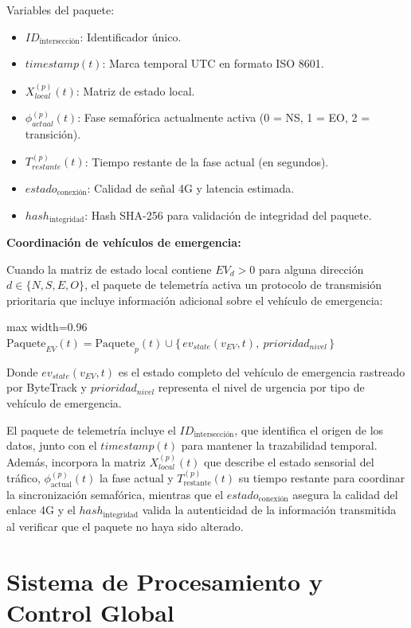 \documentclass[12pt,a4paper,oneside]{report}
\newenvironment{centeredmath}
  {\begin{center}\begin{adjustbox}{max width=0.96\linewidth}\(\displaystyle}
  {\)\end{adjustbox}\end{center}}
\begin{document}
Variables del paquete:

\begin{itemize}
\item
  \(ID_{\text{intersección}}\): Identificador único.
\item
  \(timestamp(t)\): Marca temporal UTC en formato ISO 8601.
\item
  \(X_{local}^{(p)}(t)\): Matriz de estado local.
\item
  \(\phi_{actual}^{(p)}(t)\): Fase semafórica actualmente activa (0 = NS, 1 = EO, 2 = transición).
\item
  \(T_{restante}^{(p)}(t)\): Tiempo restante de la fase actual (en segundos).
\item
  \(estado_{\text{conexión}}\): Calidad de señal 4G y latencia estimada.
\item
  \(hash_{\text{integridad}}\): Hash SHA-256 para validación de integridad del paquete.
\end{itemize}

\textbf{Coordinación de vehículos de emergencia:}

Cuando la matriz de estado local contiene \(EV_{d} > 0\) para alguna dirección \(d \in \{N, S, E, O\}\), el paquete de telemetría activa un protocolo de transmisión prioritaria que incluye información adicional sobre el vehículo de emergencia:

\begin{centeredmath}
\text{Paquete}_{EV}(t) = \text{Paquete}_{p}(t) \cup \{\, ev_{state}(v_{EV},t),\ prioridad_{nivel} \,\}
\end{centeredmath}

Donde \(ev_{state}(v_{EV},t)\) es el estado completo del vehículo de emergencia rastreado por ByteTrack y \(prioridad_{nivel}\) representa el nivel de urgencia por tipo de vehículo de emergencia.

El paquete de telemetría incluye el \(ID_{\text{intersección}}\), que identifica el origen de los datos, junto con el \(timestamp(t)\) para mantener la trazabilidad temporal. Además, incorpora la matriz \(X_{local}^{(p)}(t)\) que describe el estado sensorial del tráfico, \(\phi_{\text{actual}}^{(p)}(t)\) la fase actual y \(T_{\text{restante}}^{(p)}(t)\) su tiempo restante para coordinar la sincronización semafórica, mientras que el \(estado_{\text{conexión}}\) asegura la calidad del enlace 4G y el \(hash_{\text{integridad}}\) valida la autenticidad de la información transmitida al verificar que el paquete no haya sido alterado.

\section{Sistema de Procesamiento y Control Global}\label{sistema-de-procesamiento-y-control-global}
\end{document}
